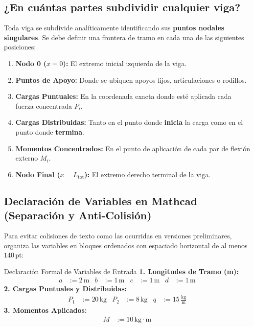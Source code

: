 \documentclass[10pt,a4paper]{article}
\begin{document}
\subsection{¿En cuántas partes subdividir cualquier viga?}
Toda viga se subdivide analíticamente identificando sus \textbf{puntos nodales singulares}. Se debe definir una frontera de tramo en cada una de las siguientes posiciones:
\begin{enumerate}[leftmargin=*,itemsep=1pt]
    \item \textbf{Nodo 0 ($x=0$):} El extremo inicial izquierdo de la viga.
    \item \textbf{Puntos de Apoyo:} Donde se ubiquen apoyos fijos, articulaciones o rodillos.
    \item \textbf{Cargas Puntuales:} En la coordenada exacta donde esté aplicada cada fuerza concentrada $P_i$.
    \item \textbf{Cargas Distribuidas:} Tanto en el punto donde \textbf{inicia} la carga como en el punto donde \textbf{termina}.
    \item \textbf{Momentos Concentrados:} En el punto de aplicación de cada par de flexión externo $M_i$.
    \item \textbf{Nodo Final ($x=L_{\text{tot}}$):} El extremo derecho terminal de la viga.
\end{enumerate}

\subsection{Declaración de Variables en Mathcad (Separación y Anti-Colisión)}
Para evitar colisiones de texto como las ocurridas en versiones preliminares, organiza las variables en bloques ordenados con espaciado horizontal de al menos $140\,\text{pt}$:

\begin{mathcadbox}{Declaración Formal de Variables de Entrada}
\textbf{1. Longitudes de Tramo (m):}
\begin{align*}
    a &:= 2\,\text{m} & b &:= 1\,\text{m} & c &:= 1\,\text{m} & d &:= 1\,\text{m}
\end{align*}
\textbf{2. Cargas Puntuales y Distribuidas:}
\begin{align*}
    P_1 &:= 20\,\text{kg} & P_2 &:= 8\,\text{kg} & q &:= 15\,\frac{\text{kg}}{\text{m}}
\end{align*}
\textbf{3. Momentos Aplicados:}
\begin{align*}
    M &:= 10\,\text{kg}\cdot\text{m}
\end{align*}
\end{mathcadbox}
\end{document}
